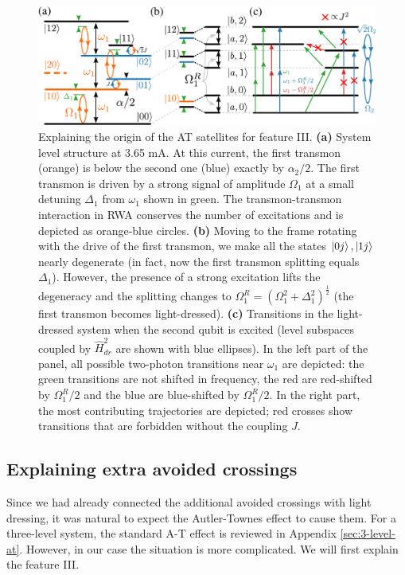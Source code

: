 \documentclass[%
 aip,
 amsmath,amssymb,
 reprint,%
]{revtex4-1}
\begin{document}
\begin{figure}
	\centering
	\includegraphics[width=.9\linewidth]{main_scheme}
	\caption{Explaining the origin of the AT satellites for feature III. \textbf{(a)} System level structure at 3.65 mA. At this current, the first transmon (orange) is below the second one (blue) exactly by $\alpha_2/2$. The first transmon is driven by a strong signal of amplitude $\Omega_1$ at a small detuning $\Delta_1$ from $\omega_1$ shown in green. The transmon-transmon interaction in RWA conserves the number of excitations and is depicted as orange-blue circles. \textbf{(b)} Moving to the frame rotating with the drive of the first transmon, we make all the states $\ket{0j},\ket{1j}$ nearly degenerate (in fact, now the first transmon splitting equals $\Delta_1$). However, the presence of a strong excitation lifts the degeneracy and the splitting changes to $\Omega_1^R = (\Omega_1^2 + \Delta_1^2)^{\frac{1}{2}}$ (the first transmon becomes light-dressed). \textbf{(c)} Transitions in the light-dressed system when the second qubit is excited (level subspaces coupled by $\hat H_{dr}^2$ are shown with blue ellipses). In the left part of the panel, all possible two-photon transitions near $\omega_1$ are depicted: the green transitions are not shifted in frequency, the red are red-shifted by $\Omega^R_1/2$ and the blue are blue-shifted by $\Omega^R_1/2$. In the right part, the most contributing trajectories are depicted; red crosses show transitions that are forbidden without the coupling $J$.}
	\label{fig:main_scheme}
\end{figure}


\subsection{Explaining extra avoided crossings}\label{sec:theory}

Since we had already connected the additional avoided crossings with light dressing, it was natural to expect the Autler-Townes effect to cause them. For a three-level system, the standard A-T effect is reviewed in Appendix \ref{sec:3-level-at}. However, in our case the situation is more complicated. We will first explain the feature III.
\end{document}

